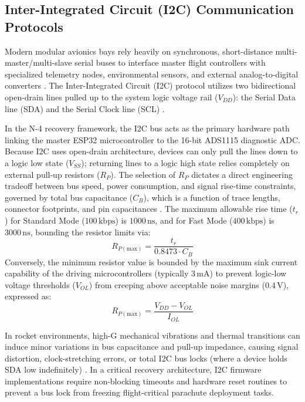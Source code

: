 \subsection{Inter-Integrated Circuit (I2C) Communication Protocols}
Modern modular avionics bays rely heavily on synchronous, short-distance multi-master/multi-slave serial buses to interface master flight controllers with specialized telemetry nodes, environmental sensors, and external analog-to-digital converters \cite{esp32_datasheet, ads1115_datasheet}. The Inter-Integrated Circuit (I2C) protocol utilizes two bidirectional open-drain lines pulled up to the system logic voltage rail ($V_{DD}$): the Serial Data line (SDA) and the Serial Clock line (SCL) \cite{voltage_divider_theory}. 

In the N-4 recovery framework, the I2C bus acts as the primary hardware path linking the master ESP32 microcontroller to the 16-bit ADS1115 diagnostic ADC. Because I2C uses open-drain architecture, devices can only pull the lines down to a logic low state ($V_{SS}$); returning lines to a logic high state relies completely on external pull-up resistors ($R_P$). The selection of $R_P$ dictates a direct engineering tradeoff between bus speed, power consumption, and signal rise-time constraints, governed by total bus capacitance ($C_B$), which is a function of trace lengths, connector footprints, and pin capacitances \cite{voltage_divider_theory}. The maximum allowable rise time ($t_r$) for Standard Mode ($100\,\mathrm{kbps}$) is $1000\,\mathrm{ns}$, and for Fast Mode ($400\,\mathrm{kbps}$) is $3000\,\mathrm{ns}$, bounding the resistor limits via:
\begin{equation}
R_{P(\text{max})} = \frac{t_r}{0.8473 \cdot C_B}
\end{equation}
Conversely, the minimum resistor value is bounded by the maximum sink current capability of the driving microcontrollers (typically $3\,\mathrm{mA}$) to prevent logic-low voltage thresholds ($V_{OL}$) from creeping above acceptable noise margins ($0.4\,\mathrm{V}$), expressed as:
\begin{equation}
R_{P(\text{max})} = \frac{V_{DD} - V_{OL}}{I_{OL}}
\end{equation}

In rocket environments, high-G mechanical vibrations and thermal transitions can induce minor variations in bus capacitance and pull-up impedance, causing signal distortion, clock-stretching errors, or total I2C bus locks (where a device holds SDA low indefinitely) \cite{high_g_electronics, freertos_manual}. In a critical recovery architecture, I2C firmware implementations require non-blocking timeouts and hardware reset routines to prevent a bus lock from freezing flight-critical parachute deployment tasks.


